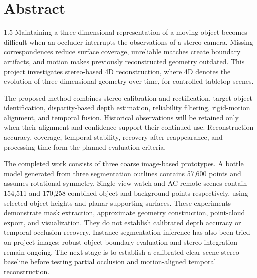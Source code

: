 \chapter*{Abstract}
\thispagestyle{plain}
\begin{spacing}{1.5}
Maintaining a three-dimensional representation of a moving object becomes difficult when an occluder interrupts the observations of a stereo camera. Missing correspondences reduce surface coverage, unreliable matches create boundary artifacts, and motion makes previously reconstructed geometry outdated. This project investigates stereo-based 4D reconstruction, where 4D denotes the evolution of three-dimensional geometry over time, for controlled tabletop scenes.

The proposed method combines stereo calibration and rectification, target-object identification, disparity-based depth estimation, reliability filtering, rigid-motion alignment, and temporal fusion. Historical observations will be retained only when their alignment and confidence support their continued use. Reconstruction accuracy, coverage, temporal stability, recovery after reappearance, and processing time form the planned evaluation criteria.

The completed work consists of three coarse image-based prototypes. A bottle model generated from three segmentation outlines contains 57,600 points and assumes rotational symmetry. Single-view watch and AC remote scenes contain 154,511 and 170,258 combined object-and-background points respectively, using selected object heights and planar supporting surfaces. These experiments demonstrate mask extraction, approximate geometry construction, point-cloud export, and visualization. They do not establish calibrated depth accuracy or temporal occlusion recovery. Instance-segmentation inference has also been tried on project images; robust object-boundary evaluation and stereo integration remain ongoing. The next stage is to establish a calibrated clear-scene stereo baseline before testing partial occlusion and motion-aligned temporal reconstruction.
\end{spacing}
\clearpage

